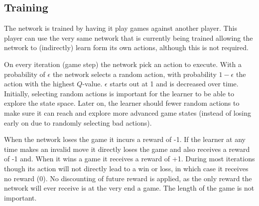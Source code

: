 \subsection{Training}
The network is trained by having it play games against another player. This player can use the very same network that is currently being trained allowing the network to (indirectly) learn form its own actions, although this is not required.

On every iteration (game step) the network pick an action to execute. With a probability of $\epsilon$ the network selects a random action, with probability $1 - \epsilon$ the action with the highest $Q$-value. $\epsilon$ starts out at 1 and is decreased over time. Initially, selecting random actions is important for the learner to be able to explore the state space. Later on, the learner should fewer random actions to make sure it can reach and explore more advanced game states (instead of losing early on due to randomly selecting bad actions).

When the network loses the game it incurs a reward of -1. If the learner at any time makes an invalid move it directly loses the game and also receives a reward of -1 and. When it wins a game it receives a reward of +1. During most iterations though its action will not directly lead to a win or loss, in which case it receives no reward (0). No discounting of future reward is applied, as the only reward the network will ever receive is at the very end a game. The length of the game is not important.